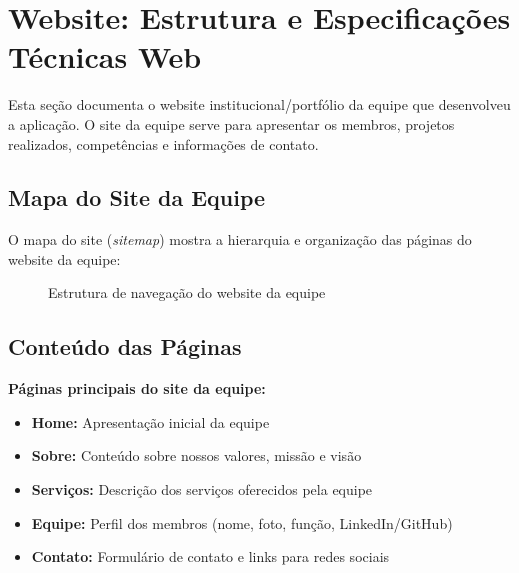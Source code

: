 \documentclass[11pt,a4paper]{article}
\begin{document}
\section{Website: Estrutura e Especificações Técnicas Web}

Esta seção documenta o website institucional/portfólio da equipe que desenvolveu a aplicação. O site da equipe serve para apresentar os membros, projetos realizados, competências e informações de contato.

\subsection{Mapa do Site da Equipe}

O mapa do site (\textit{sitemap}) mostra a hierarquia e organização das páginas do website da equipe:

\begin{figure}[H]
\centering
{}
\caption{Estrutura de navegação do website da equipe}
\label{fig:sitemap}
\end{figure}

\subsection{Conteúdo das Páginas}

\textbf{Páginas principais do site da equipe:}

\begin{itemize}
    \item \textbf{Home:} Apresentação inicial da equipe
    \item \textbf{Sobre:} Conteúdo sobre nossos valores, missão e visão
    \item \textbf{Serviços:} Descrição dos serviços oferecidos pela equipe
    \item \textbf{Equipe:} Perfil dos membros (nome, foto, função, LinkedIn/GitHub)
    \item \textbf{Contato:} Formulário de contato e links para redes sociais
\end{itemize}
\end{document}
